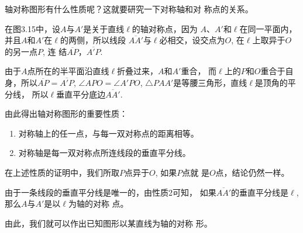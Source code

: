 轴对称图形有什么性质呢？这就要研究一下对称轴和对
称点的关系。

在图3.15中，设$A$与$A'$是关于直线$\ell$的轴对称点，因为
$A$、$A'$和$\ell$在同一平面内，并且$A$和$A'$在$\ell$的两侧，所以线段
$\overline{AA'}$与$\ell$必相交，设交点为$O$, 在$\ell$上取异于$O$的另一点$P$, 连
结$\overline{AP}$，$\overline{A'P}$.

由于$A$点所在的半平面沿直线$\ell$折叠过来，$A$和$A'$重合，
而$\ell$上的$P$和$O$重合于自身，所以$\overline{AP}=\overline{A'P}$, $\angle APO=\angle A'PO$, $\triangle PAA'$是等腰三角形，直线$\ell$是顶角的平分线，
所以$\ell$垂直平分底边$\overline{AA'}$.

由此得出轴对称图形的重要性质：
\begin{enumerate}
\item 对称轴上的任一点，与每一双对称点的距离相等。
\item 对称轴是每一双对称点所连线段的垂直平分线。
\end{enumerate}

在上述性质的证明中，我们所取$P$点异于$O$, 如果$P$点就
是$O$点，结论仍然一样。

由于一条线段的垂直平分线是唯一的，由性质2可知，
如果$\overline{AA'}$的垂直平分线是$\ell$, 那么$A$与$A'$是以$\ell$为轴的对称
点。

由此，我们就可以作出已知图形以某直线为轴的对称
形。

\begin{figure}[htp]\centering
    \begin{minipage}[t]{0.48\textwidth}
    \centering
{}
    \caption{}
    \end{minipage}
    \begin{minipage}[t]{0.48\textwidth}
    \centering
    \caption{}
    \end{minipage}
    \end{figure}



